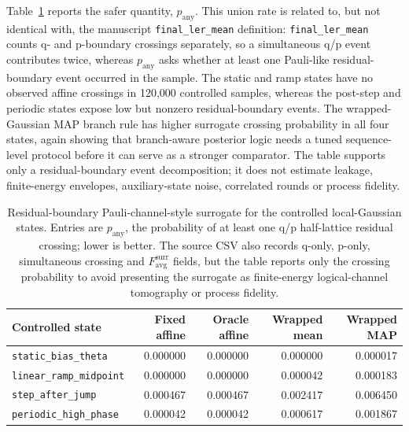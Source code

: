 \documentclass[11pt]{article}
\newcommand{\finalLER}{\texttt{final\_ler\_mean}}
\begin{document}
Table~\ref{tab:logical-channel-surrogate} reports the safer quantity,
\(p_{\mathrm{any}}\).  This union rate is related to, but not identical with,
the manuscript \finalLER{} definition: \finalLER{} counts q- and p-boundary
crossings separately, so a simultaneous q/p event contributes twice, whereas
\(p_{\mathrm{any}}\) asks whether at least one Pauli-like residual-boundary
event occurred in the sample.  The static and ramp states have no observed
affine crossings in 120,000 controlled samples, whereas the post-step and
periodic states expose low but nonzero residual-boundary events.  The
wrapped-Gaussian MAP branch rule has higher surrogate crossing probability in
all four states, again showing that branch-aware posterior logic needs a
tuned sequence-level protocol before it can serve as a stronger comparator.
The table supports only a residual-boundary event decomposition; it does not
estimate leakage, finite-energy envelopes, auxiliary-state noise, correlated
rounds or process fidelity.

\begin{table}[t]
\centering
\small
\begin{tabular}{@{}lrrrr@{}}
\toprule
Controlled state & Fixed affine & Oracle affine & Wrapped mean & Wrapped MAP \\
\midrule
\texttt{static\_bias\_theta} & 0.000000 & 0.000000 & 0.000000 & 0.000017 \\
\texttt{linear\_ramp\_midpoint} & 0.000000 & 0.000000 & 0.000042 & 0.000183 \\
\texttt{step\_after\_jump} & 0.000467 & 0.000467 & 0.002417 & 0.006450 \\
\texttt{periodic\_high\_phase} & 0.000042 & 0.000042 & 0.000617 & 0.001867 \\
\bottomrule
\end{tabular}
\caption{Residual-boundary Pauli-channel-style surrogate for the controlled
local-Gaussian states.  Entries are \(p_{\mathrm{any}}\), the probability of
at least one q/p half-lattice residual crossing; lower is better.  The source
CSV also records q-only, p-only, simultaneous crossing and
\(F_{\mathrm{avg}}^{\mathrm{surr}}\) fields, but the table reports only the
crossing probability to avoid presenting the surrogate as finite-energy
logical-channel tomography or process fidelity.}
\label{tab:logical-channel-surrogate}
\end{table}
\end{document}
